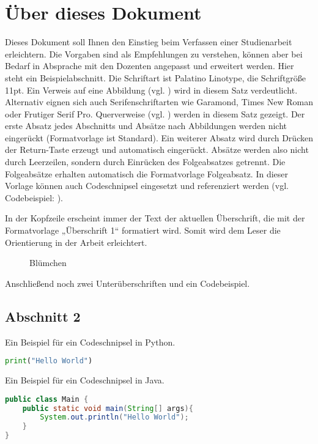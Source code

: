 \section{Über dieses Dokument}\label{sec:about}
Dieses Dokument soll Ihnen den Einstieg beim Verfassen einer Studienarbeit erleichtern.
Die Vorgaben sind als Empfehlungen zu verstehen, können aber bei Bedarf in Absprache mit den Dozenten angepasst und erweitert werden.
Hier steht ein Beispielabschnitt.
Die Schriftart ist Palatino Linotype, die Schriftgröße 11pt.
Ein Verweis auf eine Abbildung (vgl. ) wird in diesem Satz verdeutlicht.
Alternativ eignen sich auch Serifenschriftarten wie Garamond, Times New Roman oder Frutiger Serif Pro.
Querverweise (vgl. ) werden in diesem Satz  gezeigt.
Der erste Absatz jedes Abschnitts und Absätze nach Abbildungen werden nicht eingerückt (Formatvorlage ist Standard).
Ein weiterer Absatz wird durch Drücken der Return-Taste erzeugt und automatisch eingerückt.
Absätze werden also nicht durch Leerzeilen, sondern durch Einrücken des Folgeabsatzes getrennt.
Die Folgeabsätze erhalten automatisch die Formatvorlage Folgeabsatz.
In dieser Vorlage können auch Codeschnipsel eingesetzt und referenziert werden (vgl. Codebeispiel: ).

In der Kopfzeile erscheint immer der Text der aktuellen Überschrift, die mit der Formatvorlage „Überschrift 1“ formatiert wird. Somit wird dem Leser die Orientierung in der Arbeit erleichtert.\\

\begin{figure}[h!]
	\caption{Blümchen \citep{Norman:2002}}
	\label{img:norman2010}
\end{figure}

Anschließend noch zwei Unterüberschriften und ein Codebeispiel.

\subsection{Abschnitt 2}\label{section:2}
Ein Beispiel für ein Codeschnipsel in Python.\\

\begin{lstlisting}[captionpos=b, belowcaptionskip=4pt, caption=Hello World (Python), label=helloworld, language=Python]
print("Hello World")
\end{lstlisting}

Ein Beispiel für ein Codeschnipsel in Java.\\

\begin{lstlisting}[captionpos=b, belowcaptionskip=4pt, caption=Hello World (Java), language=Java]
public class Main {
	public static void main(String[] args){
		System.out.println("Hello World");
	}
}
\end{lstlisting}
